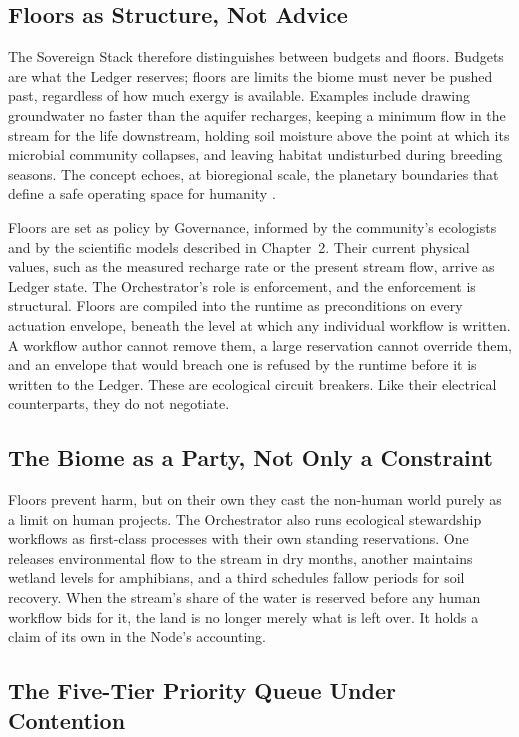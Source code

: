 \subsection{Floors as Structure, Not Advice}

The Sovereign Stack therefore distinguishes between budgets and floors. Budgets are what the Ledger reserves; floors are limits the biome must never be pushed past, regardless of how much exergy is available. Examples include drawing groundwater no faster than the aquifer recharges, keeping a minimum flow in the stream for the life downstream, holding soil moisture above the point at which its microbial community collapses, and leaving habitat undisturbed during breeding seasons. The concept echoes, at bioregional scale, the planetary boundaries that define a safe operating space for humanity \parencite{rockstrom2009safe}.

Floors are set as policy by Governance, informed by the community's ecologists and by the scientific models described in Chapter~2. Their current physical values, such as the measured recharge rate or the present stream flow, arrive as Ledger state. The Orchestrator's role is enforcement, and the enforcement is structural. Floors are compiled into the runtime as preconditions on every actuation envelope, beneath the level at which any individual workflow is written. A workflow author cannot remove them, a large reservation cannot override them, and an envelope that would breach one is refused by the runtime before it is written to the Ledger. These are ecological circuit breakers. Like their electrical counterparts, they do not negotiate.

\subsection{The Biome as a Party, Not Only a Constraint}

Floors prevent harm, but on their own they cast the non-human world purely as a limit on human projects. The Orchestrator also runs ecological stewardship workflows as first-class processes with their own standing reservations. One releases environmental flow to the stream in dry months, another maintains wetland levels for amphibians, and a third schedules fallow periods for soil recovery. When the stream's share of the water is reserved before any human workflow bids for it, the land is no longer merely what is left over. It holds a claim of its own in the Node's accounting.

\subsection{The Five-Tier Priority Queue Under Contention}


